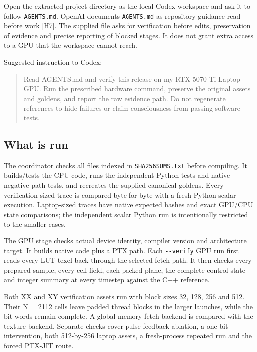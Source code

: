 \documentclass[11pt,a4paper]{article}
\begin{document}
Open the extracted project directory as the local Codex workspace and ask it to follow \texttt{AGENTS.md}. OpenAI documents \texttt{AGENTS.md} as repository guidance read before work {[}H7{]}. The supplied file asks for verification before edits, preservation of evidence and precise reporting of blocked stages. It does not grant extra access to a GPU that the workspace cannot reach.

Suggested instruction to Codex:

\begin{quote}
Read AGENTS.md and verify this release on my RTX 5070 Ti Laptop GPU. Run the prescribed hardware command, preserve the original assets and goldens, and report the raw evidence path. Do not regenerate references to hide failures or claim consciousness from passing software tests.
\end{quote}

\subsection{What is run}\label{what-is-run}

The coordinator checks all files indexed in \texttt{SHA256SUMS.txt} before compiling. It builds/tests the CPU code, runs the independent Python tests and native negative-path tests, and recreates the supplied canonical goldens. Every verification-sized trace is compared byte-for-byte with a fresh Python scalar execution. Laptop-sized traces have native expected hashes and exact GPU/CPU state comparisons; the independent scalar Python run is intentionally restricted to the smaller cases.

The GPU stage checks actual device identity, compiler version and architecture target. It builds native  code plus a  PTX path. Each \texttt{-\/-verify} GPU run first reads every LUT texel back through the selected fetch path. It then checks every prepared sample, every cell field, each packed plane, the complete control state and integer summary at every timestep against the C++ reference.

Both XX and XY verification assets run with block sizes 32, 128, 256 and 512. Their N = 2112 cells leave padded thread blocks in the larger launches, while the bit words remain complete. A global-memory fetch backend is compared with the texture backend. Separate checks cover pulse-feedback ablation, a one-bit intervention, both 512-by-256 laptop assets, a fresh-process repeated run and the forced PTX-JIT route.
\end{document}
